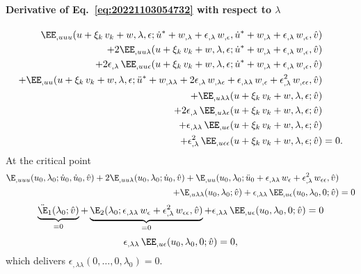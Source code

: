 \paragraph{Derivative of Eq.~\eqref{eq:20221103054732} with respect to \(\lambda\)}
\begin{equation}
  \label{eq:20221116070255}
  \begin{aligned}[b]
    \EE_{,uuu}(u + \xi_k \, v_k + w, \lambda, \epsilon; \dot{u}^\ast + w_{,\lambda} + \epsilon_{,\lambda} \, w_{,\epsilon}, \dot{u}^\ast + w_{,\lambda} + \epsilon_{,\lambda} \, w_{,\epsilon}, \hat{v}) &\\
    + 2\EE_{,uu\lambda}(u + \xi_k \, v_k + w, \lambda, \epsilon; \dot{u}^\ast + w_{,\lambda} + \epsilon_{,\lambda} \, w_{,\epsilon}, \hat{v}) &\\
    + 2\epsilon_{,\lambda} \, \EE_{,uu\epsilon}(u + \xi_k \, v_k + w, \lambda, \epsilon; \dot{u}^\ast + w_{,\lambda} + \epsilon_{,\lambda} \, w_{,\epsilon}, \hat{v}) &\\
    + \EE_{,uu}(u + \xi_k \, v_k + w, \lambda, \epsilon; \ddot{u}^\ast + w_{,\lambda\lambda} + 2\epsilon_{,\lambda} \, w_{,\lambda\epsilon} + \epsilon_{,\lambda\lambda} \, w_{,\epsilon} + \epsilon_{,\lambda}^2 \, w_{,\epsilon\epsilon}, \hat{v}) &\\
    + \EE_{,u\lambda\lambda}(u + \xi_k \, v_k + w, \lambda, \epsilon; \hat{v})&\\
    + 2\epsilon_{,\lambda} \, \EE_{,u\lambda\epsilon}(u + \xi_k \, v_k + w, \lambda, \epsilon; \hat{v}) &\\
    + \epsilon_{,\lambda\lambda} \, \EE_{,u\epsilon}(u + \xi_k \, v_k + w, \lambda, \epsilon; \hat{v}) &\\
    + \epsilon_{,\lambda}^2 \, \EE_{,u\epsilon\epsilon}(u + \xi_k \, v_k + w, \lambda, \epsilon; \hat{v}) &= 0.
  \end{aligned}
\end{equation}
At the critical point
\begin{equation*}
  \begin{aligned}[b]
    \E_{,uuu}(u_0, \lambda_0; \dot{u}_0, \dot{u}_0, \hat{v}) + 2\E_{,uu\lambda}(u_0, \lambda_0; \dot{u}_0, \hat{v}) + \E_{,uu}(u_0, \lambda_0; \ddot{u}_0 + \epsilon_{,\lambda\lambda} \, w_\epsilon + \epsilon_{,\lambda}^2 \, w_{\epsilon\epsilon}, \hat{v}) &\\
    + \E_{,u\lambda\lambda}(u_0, \lambda_0; \hat{v}) + \epsilon_{,\lambda\lambda} \, \EE_{,u\epsilon}(u_0, \lambda_0, 0; \hat{v}) &= 0
  \end{aligned}
\end{equation*}
\begin{equation*}
  \underbrace{\ddot{\E}_1(\lambda_0; \hat{v})}_{=0}
  + \underbrace{\E_2(\lambda_0; \epsilon_{,\lambda\lambda} \, w_\epsilon + \epsilon_{,\lambda}^2 \, w_{\epsilon\epsilon}, \hat{v})}_{=0}
  + \epsilon_{,\lambda\lambda} \, \EE_{,u\epsilon}(u_0, \lambda_0, 0; \hat{v}) = 0
\end{equation*}
\begin{equation}
  \epsilon_{,\lambda\lambda} \, \EE_{,u\epsilon}(u_0, \lambda_0, 0; \hat{v}) = 0,
\end{equation}
which delivers \(\epsilon_{,\lambda\lambda}(0, \ldots, 0, \lambda_0) = 0\).


